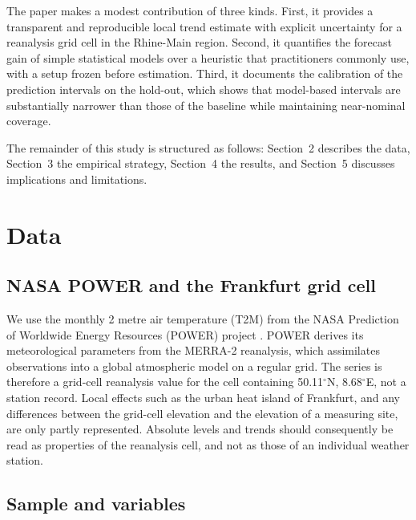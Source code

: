 The paper makes a modest contribution of three kinds. First, it provides a transparent and reproducible local trend estimate with explicit uncertainty for a reanalysis grid cell in the Rhine-Main region. Second, it quantifies the forecast gain of simple statistical models over a heuristic that practitioners commonly use, with a setup frozen before estimation. Third, it documents the calibration of the prediction intervals on the hold-out, which shows that model-based intervals are substantially narrower than those of the baseline while maintaining near-nominal coverage.

The remainder of this study is structured as follows: Section~2 describes the data, Section~3 the empirical strategy, Section~4 the results, and Section~5 discusses implications and limitations.

\section{Data}

\subsection{NASA POWER and the Frankfurt grid cell}

We use the monthly 2 metre air temperature (T2M) from the NASA Prediction of Worldwide Energy Resources (POWER) project \citep{NASA_POWER}. POWER derives its meteorological parameters from the MERRA-2 reanalysis, which assimilates observations into a global atmospheric model on a regular grid. The series is therefore a grid-cell reanalysis value for the cell containing 50.11$^\circ$N, 8.68$^\circ$E, not a station record. Local effects such as the urban heat island of Frankfurt, and any differences between the grid-cell elevation and the elevation of a measuring site, are only partly represented. Absolute levels and trends should consequently be read as properties of the reanalysis cell, and not as those of an individual weather station.

\subsection{Sample and variables}

